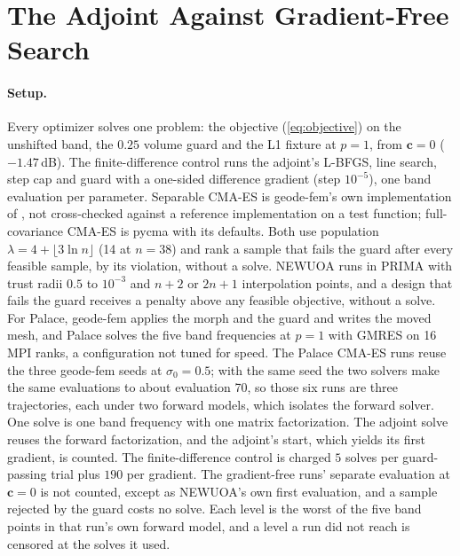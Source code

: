 \documentclass{anvil-paper}
\begin{document}
\section{The Adjoint Against Gradient-Free Search}
\label{sec:baselines}

\paragraph{Setup.}
Every optimizer solves one problem: the objective (\ref{eq:objective}) on
the unshifted band, the $0.25$ volume guard and the L1 fixture at $p = 1$,
from $\mathbf{c} = 0$ ($-1.47$\,dB). The finite-difference control runs the
adjoint's L-BFGS, line search, step cap and guard with a one-sided
difference gradient (step $10^{-5}$), one band evaluation per parameter.
Separable CMA-ES is geode-fem's own implementation of
\citet{ros2008separable}, not cross-checked against a reference
implementation on a test function; full-covariance CMA-ES is pycma
\citep{pycma} with its defaults. Both use population
$\lambda = 4 + \lfloor 3\ln n\rfloor$ (14 at $n = 38$) and rank a sample
that fails the guard after every feasible sample, by its violation, without
a solve. NEWUOA runs in PRIMA with trust radii $0.5$ to $10^{-3}$ and $n + 2$
or $2n + 1$ interpolation points, and a design that fails the guard receives
a penalty above any feasible objective, without a solve. For Palace,
geode-fem applies the morph and the guard and writes the moved mesh, and
Palace solves the five band frequencies at $p = 1$ with GMRES on 16 MPI
ranks, a configuration not tuned for speed. The Palace CMA-ES runs reuse the
three geode-fem seeds at $\sigma_0 = 0.5$; with the same seed the two solvers
make the same evaluations to about evaluation 70, so those six runs are
three trajectories, each under two forward models, which isolates the
forward solver. One solve is one band frequency with one matrix factorization. The adjoint
solve reuses the forward factorization, and the adjoint's start, which
yields its first gradient, is counted. The finite-difference control is
charged $5$ solves per guard-passing trial plus $190$ per gradient. The
gradient-free runs' separate evaluation at $\mathbf{c} = 0$ is not counted,
except as NEWUOA's own first evaluation, and a sample rejected by the guard
costs no solve. Each level is the worst of the five band points in that
run's own forward model, and a level a run did not reach is censored at the
solves it used.
\end{document}

